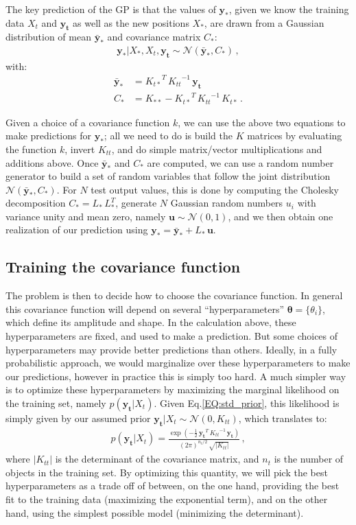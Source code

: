 \documentclass[11pt,a4paper]{article}
\newcommand\req[1]{Eq.\;\ref{#1}}
\newcommand{\abs}[1]{\left| #1 \right|}
\numberwithin{equation}{section}
\begin{document}
The key prediction of the GP is that the values of $\mathbf{y_*}$, given we know the training data $X_t$ and $\mathbf{y_t}$ as well as the new positions $X_*$, are drawn from a Gaussian distribution of mean $\mathbf{\bar{y}_*}$ and covariance matrix $C_*$:
\begin{align}
\mathbf{y_*} | X_*, X_t, \mathbf{y_t} \sim \mathcal{N}(\mathbf{\bar{y}_*}, C_*)\,,
\end{align}
with:
\begin{align}
\mathbf{\bar{y}_*} &= {K_{t*}}^T\,{K_{tt}}^{-1}\,\mathbf{y_t}\, \\
C_* &= K_{**} - {K_{t*}}^T\,{K_{tt}}^{-1}\,K_{t*}\,.
\end{align}

Given a choice of a covariance function $k$, we can use the above two equations to make predictions for $\mathbf{y_*}$; all we need to do is build the $K$ matrices by evaluating the function $k$, invert $K_{tt}$, and do simple matrix/vector multiplications and additions above. Once $\mathbf{\bar{y}_*}$ and $C_*$ are computed, we can use a random number generator to build a set of random variables that follow the joint distribution $\mathcal{N}(\mathbf{\bar{y}_*}, C_*)$. For $N$ test output values, this is done by computing the Cholesky decomposition $C_* = L_*\,L_*^T$, generate $N$ Gaussian random numbers $u_i$ with variance unity and mean zero, namely $\mathbf{u} \sim \mathcal{N}(0, 1)$, and we then obtain one realization of our prediction using $\mathbf{y_*} = \mathbf{\bar{y}_*} + L_*\,\mathbf{u}$.

\subsection{Training the covariance function}

The problem is then to decide how to choose the covariance function. In general this covariance function will depend on several ``hyperparameters'' ${\bm\theta} = \{\theta_i\}$, which define its amplitude and shape. In the calculation above, these hyperparameters are fixed, and used to make a prediction. But some choices of hyperparameters may provide better predictions than others. Ideally, in a fully probabilistic approach, we would marginalize over these hyperparameters to make our predictions, however in practice this is simply too hard. A much simpler way is to optimize these hyperparameters by maximizing the marginal likelihood on the training set, namely $p(\mathbf{y_t}|X_t)$. Given \req{EQ:std_prior}, this likelihood is simply given by our assumed prior $\mathbf{y_t} | X_t \sim \mathcal{N}(0,K_{tt})$, which translates to:
\begin{align}
p(\mathbf{y_t} | X_t) = \frac{\exp\left(-\frac{1}{2}\,\mathbf{y_t}^T\,{K_{tt}}^{-1}\,\mathbf{y_t}\right)}{(2\pi)^{n_t/2}\,\sqrt{\abs{K_{tt}}}}\,,
\end{align}
where $\abs{K_{tt}}$ is the determinant of the covariance matrix, and $n_t$ is the number of objects in the training set. By optimizing this quantity, we will pick the best hyperparameters as a trade off of between, on the one hand, providing the best fit to the training data (maximizing the exponential term), and on the other hand, using the simplest possible model (minimizing the determinant).
\end{document}

